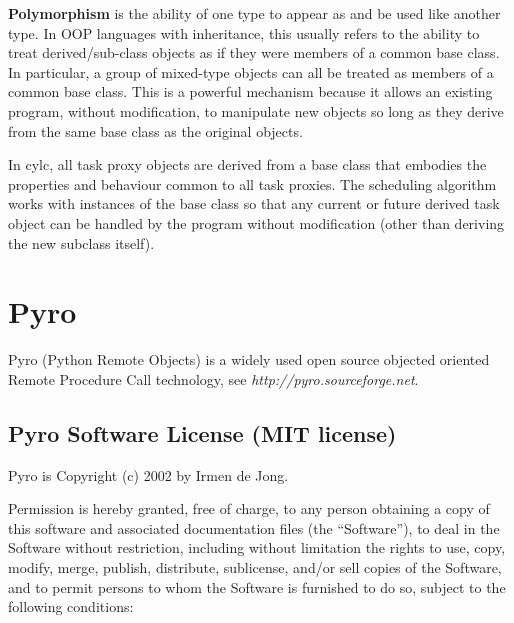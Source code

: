 \documentclass[11pt,a4paper]{article}
\begin{document}


{\bf Polymorphism} is the ability of one type to appear as and be used
like another type.  In OOP languages with inheritance, this usually
refers to the ability to treat derived/sub-class objects as if they were
members of a common base class. In particular, a group of mixed-type
objects can all be treated as members of a common base class. 
This is a powerful mechanism because it allows an existing program,
without modification, to manipulate new objects so long as they 
derive from the same base class as the original objects.

In cylc, all task proxy objects are derived from a base class that 
embodies the properties and behaviour common to all task proxies. 
The scheduling algorithm works with instances of the base class so that
any current or future derived task object can be handled by the program
without modification (other than deriving the new subclass itself).


\pagebreak
\section{Pyro} 
\label{Pyro}

Pyro (Python Remote Objects) is a widely used open source objected
oriented Remote Procedure Call technology, see {\em
http://pyro.sourceforge.net}.

\subsection{Pyro Software License (MIT license)}
\label{PyroSoftwareLicense(MITlicense)}

Pyro is Copyright (c) 2002  by Irmen de Jong.

Permission is hereby granted, free of charge, to any person obtaining a
copy of this software and associated documentation files (the
``Software''), to deal in the Software without restriction, including
without limitation the rights to use, copy, modify, merge, publish,
distribute, sublicense, and/or sell copies of the Software, and to
permit persons to whom the Software is furnished to do so, subject to
the following conditions:
\end{document}
